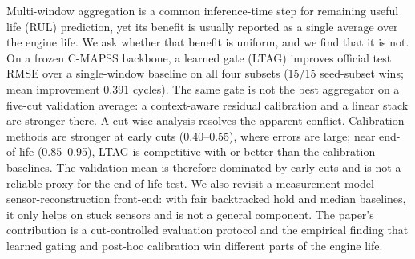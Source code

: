Multi-window aggregation is a common inference-time step for remaining useful
life (RUL) prediction, yet its benefit is usually reported as a single average
over the engine life. We ask whether that benefit is uniform, and we find that it
is not. On a frozen C-MAPSS backbone, a learned gate (LTAG) improves official
test RMSE over a single-window baseline on all four subsets (15/15 seed-subset
wins; mean improvement 0.391 cycles). The same gate is not the best aggregator on
a five-cut validation average: a context-aware residual calibration and a linear
stack are stronger there. A cut-wise analysis resolves the apparent conflict.
Calibration methods are stronger at early cuts (0.40--0.55), where errors are
large; near end-of-life (0.85--0.95), LTAG is competitive with or better than the
calibration baselines. The validation mean is therefore dominated by early cuts
and is not a reliable proxy for the end-of-life test. We also revisit a
measurement-model sensor-reconstruction front-end: with fair backtracked hold and
median baselines, it only helps on stuck sensors and is not a general component.
The paper's contribution is a cut-controlled evaluation protocol and the
empirical finding that learned gating and post-hoc calibration win different
parts of the engine life.
